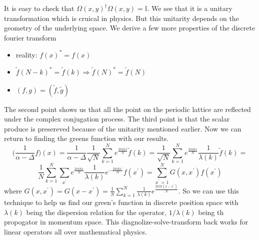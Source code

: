 \documentclass[11pt,a4paper]{article}
\begin{document}
It is easy to check that $\Omega(x,y)^{\dagger}\Omega(x,y) = \mathbb{I}$. We see that it is a unitary transformation which is cruical in physics. But this unitarity depends on the geometry of the underlying space.  We derive a few more properties of the discrete fourier transform
\begin{itemize}
\item reality: $f(x)^{*} = f(x)$
\item $\tilde{f}(N-k)^{*} = \tilde{f}(k) \Rightarrow \tilde{f}(N)^{*} = \tilde{f}(N)$
\item $(f,g) = (\tilde{f},\tilde{g})$
\end{itemize}
The second point shows us that all the point on the periodic lattice are reflected under the complex conjugation process. The third point is that the scalar produce is presereved because of the unitarity mentioned earlier. Now we can return to finding the greens function with our results.
$$
\Big(\frac{1}{\alpha-\Delta}f\Big)(x) = \frac{1}{\alpha-\Delta}\frac{1}{\sqrt{N}}\sum_{k=1}^{N}e^{\frac{2\pi i k x}{N}}\tilde{f}(k) =  \frac{1}{\sqrt{N}}\sum_{k=1}^{N}e^{\frac{2\pi i k x}{N}}\frac{1}{\lambda(k)}\tilde{f}(k) = 
$$
$$
\frac{1}{N}\sum_{k=1}^{N}\sum_{x^{\prime}}e^{\frac{2\pi i k x}{N}}\frac{1}{\lambda(k)}e^{-\frac{2\pi i k x^{\prime}}{N}}f(x^{\prime}) = \sum_{x^{\prime}=1}^{N}G(x,x^{\prime})f(x^{\prime})
$$
where $G(x,x^{\prime})= G(x-x^{\prime}) = \frac{1}{N}\sum_{k=1}^{N}\frac{1}{\lambda(k)}e^{\frac{2\pi ik(x-x^{\prime})}{N}}$. So we can use this technique to help us find our green's function in discrete position space with $\lambda(k)$ being the dispersion relation for the operator, $1/\lambda(k)$ being th propogator in momentum space. This diagnolize-solve-transform back works for linear operators all over mathematical physics.
\newline
\end{document}
